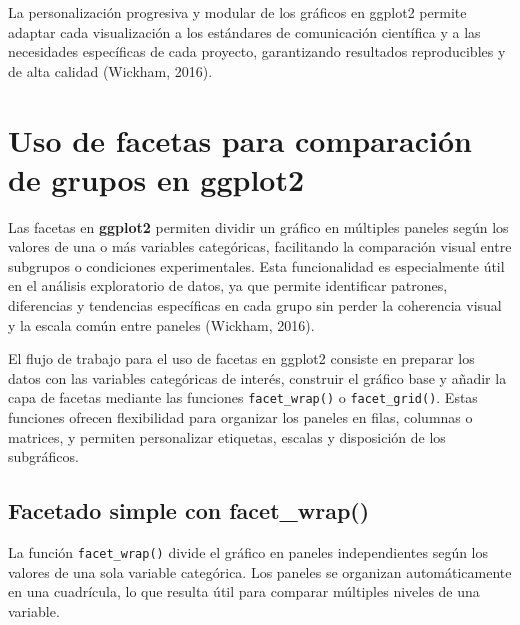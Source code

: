 \documentclass[
  spanish,
  a4paper,
  DIV=11,
  numbers=noendperiod,
  onepage,
  openany]{scrreprt}
\begin{document}
La personalización progresiva y modular de los gráficos en ggplot2
permite adaptar cada visualización a los estándares de comunicación
científica y a las necesidades específicas de cada proyecto,
garantizando resultados reproducibles y de alta calidad (Wickham, 2016).

\section{Uso de facetas para comparación de grupos en
ggplot2}\label{uso-de-facetas-para-comparaciuxf3n-de-grupos-en-ggplot2}

Las facetas en \textbf{ggplot2} permiten dividir un gráfico en múltiples
paneles según los valores de una o más variables categóricas,
facilitando la comparación visual entre subgrupos o condiciones
experimentales. Esta funcionalidad es especialmente útil en el análisis
exploratorio de datos, ya que permite identificar patrones, diferencias
y tendencias específicas en cada grupo sin perder la coherencia visual y
la escala común entre paneles (Wickham, 2016).

El flujo de trabajo para el uso de facetas en ggplot2 consiste en
preparar los datos con las variables categóricas de interés, construir
el gráfico base y añadir la capa de facetas mediante las funciones
\texttt{facet\_wrap()} o \texttt{facet\_grid()}. Estas funciones ofrecen
flexibilidad para organizar los paneles en filas, columnas o matrices, y
permiten personalizar etiquetas, escalas y disposición de los
subgráficos.

\subsection{Facetado simple con
facet\_wrap()}\label{facetado-simple-con-facet_wrap}

La función \texttt{facet\_wrap()} divide el gráfico en paneles
independientes según los valores de una sola variable categórica. Los
paneles se organizan automáticamente en una cuadrícula, lo que resulta
útil para comparar múltiples niveles de una variable.
\end{document}

